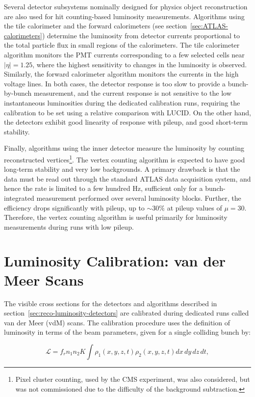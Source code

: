 Several detector subsystems nominally designed for physics object reconstruction are also used for hit counting-based luminosity measurements. Algorithms using the tile calorimeter and the forward calorimeters (see section~\ref{sec:ATLAS-calorimeters}) determine the luminosity from detector currents proportional to the total particle flux in small regions of the calorimeters. The tile calorimeter algorithm monitors the PMT currents corresponding to a few selected cells near $|\eta|=1.25$, where the highest sensitivity to changes in the luminosity is observed. Similarly, the forward calorimeter algorithm monitors the currents in the high voltage lines. In both cases, the detector response is too slow to provide a bunch-by-bunch measurement, and the current response is not sensitive to the low instantaneous luminosities during the dedicated calibration runs, requiring the calibration to be set using a relative comparison with LUCID. On the other hand, the detectors exhibit good linearity of response with pileup, and good short-term stability. 

Finally, algorithms using the inner detector measure the luminosity by counting reconstructed vertices\footnote{Pixel cluster counting, used by the CMS experiment, was also considered, but was not commissioned due to the difficulty of the background subtraction.}. The vertex counting algorithm is expected to have good long-term stability and very low backgrounds. A primary drawback is that the data must be read out through the standard ATLAS data acquisition system, and hence the rate is limited to a few hundred Hz, sufficient only for a bunch-integrated measurement performed over several luminosity blocks. Further, the efficiency drops significantly with pileup, up to $\sim30\%$ at pileup values of $\mu=30$. Therefore, the vertex counting algorithm is useful primarily for luminosity measurements during runs with low pileup. 


\section{Luminosity Calibration: van der Meer Scans}\label{sec:reco-luminosity-calibration}
The visible cross sections for the detectors and algorithms described in section~\ref{sec:reco-luminosity-detectors} are calibrated during dedicated runs called van der Meer (vdM) scans. The calibration procedure uses the definition of luminosity in terms of the beam parameters, given for a single colliding bunch by:

\begin{equation}\label{eqn:luminosity-geometrical}
	\mathcal{L} = f_r n_1 n_2 K \int \rho_1(x,y,z,t) \rho_2(x,y,z,t) dx\,dy\,dz\,dt,
\end{equation}


